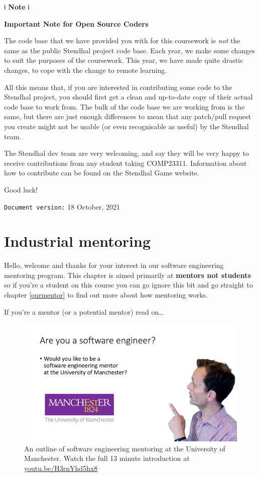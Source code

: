 \documentclass[
]{book}
\begin{document}
ℹ️ \textbf{Note} ℹ️

\textbf{Important Note for Open Source Coders}

The code base that we have provided you with for this coursework is \emph{not} the same as the public Stendhal project code base. Each year, we make some changes to suit the purposes of the coursework. This year, we have made quite drastic changes, to cope with the change to remote learning.

All this means that, if you are interested in contributing some code to the Stendhal project, you should first get a clean and up-to-date copy of their actual code base to work from. The bulk of the code base we are working from is the same, but there are just enough differences to mean that any patch/pull request you create might not be usable (or even recognisable as useful) by the Stendhal team.

The Stendhal dev team are very welcoming, and say they will be very happy to receive contributions from any student taking COMP23311. Information about how to contribute can be found on the Stendhal Game website.

Good luck!

\texttt{Document\ version:} 18 October, 2021

\hypertarget{mentoring}{%
\chapter{Industrial mentoring}\label{mentoring}}

Hello, welcome and thanks for your interest in our software engineering mentoring program. This chapter is aimed primarily at \textbf{mentors not students} so if you're a student on this course you can go ignore this bit and go straight to chapter \ref{ourmentor} to find out more about how mentoring works.

If you're a mentor (or a potential mentor) read on\ldots{}

\begin{figure}

{\centering \includegraphics[width=1\linewidth]{images/software-mentoring} 

}

\caption{An outline of software engineering mentoring at the University of Manchester. Watch the full 13 minute introduction at \href{https://youtu.be/H3rnYhd5hx8}{youtu.be/H3rnYhd5hx8}}\label{fig:mentoring-fig}
\end{figure}
\end{document}
